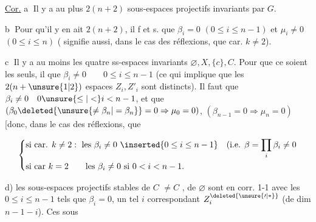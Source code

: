 
\uline{Cor.} \textcircled{a} Il y a au plus $2(n+2)$ sous-espaces projectifs invariants par $G$.

\textcircled{b} Pour qu'il y en ait $2(n+2)$, il f et s. que $\beta_i=0$ $(0\le i\le n-1)$ et $\mu_i\ne0$ \deleted{\unsure{$\forall$}} $(0\le i\le n)$ ( signifie aussi, dans le cas des réflexions, que car. $k\ne2$).

\textcircled{c}  Il y a au moins les quatre ss-espaces invariants $\varnothing,X,\{c\},C$. Pour que ce soient les seuls, il   que $\beta_i\ne0\qquad 0\le i\le n-1$ (ce qui implique que les $2(n+\unsure{1|2})$ espaces $Z_i,Z'_i$ sont distincts). Il faut  que $\beta_i\ne0\quad 0\unsure{\le|<}i<n-1$, et que $(\beta_0\deleted{\unsure{\ne\beta_n|=\beta_n}}=0\Rightarrow\mu_0=0)$, $(\beta_{n-1}=0\Rightarrow\mu_n=0)$ [donc, dans le cas des réflexions, que

\[
\left\{\begin{aligned}
&\text{si car. }k\ne2:\ \text{les }\beta_i\ne0\ \inserted{0\le i\le n-1}\quad
(\text{i.e. }\beta=\prod_i\beta_i\ne0\\
&\text{si car }k=2\qquad\text{les }\beta_i\ne0\text{ si }0<i<n-1.
\end{aligned}\right.
\]



d) les sous-espaces projectifs stables de $C$  $\ne C$ , de $\varnothing$ sont en corr. 1-1 avec les $0\le i\le n-1$ tels que $\beta_i=0$,  un tel $i$ correspondant $Z_i^{\deleted{\unsure{\prime|*}}}$ (de dim $n-1-i$). Ces sous
